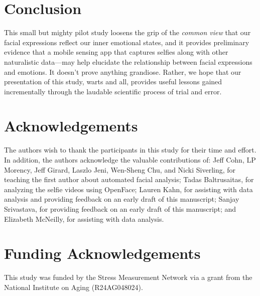 \documentclass[authordate, empirical]{jote-new-article}
\begin{document}
\section{Conclusion}







This small but mighty pilot study loosens the grip of the \emph{common view} that our facial expressions reflect our inner emotional states, and it provides preliminary evidence that a mobile sensing app that captures selfies along with other naturalistic data—may help elucidate the relationship between facial expressions and emotions. It doesn't prove anything grandiose. Rather, we hope that our presentation of this study, warts and all, provides useful lessons gained incrementally through the laudable scientific process of trial and error.






\section{Acknowledgements}







The authors wish to thank the participants in this study for their time and effort. In addition, the authors acknowledge the valuable contributions of: Jeff Cohn, LP Morency, Jeff Girard, Laszlo Jeni, Wen-Sheng Chu, and Nicki Siverling, for teaching the first author about automated facial analysis; Tadas Baltrusaitas, for analyzing the selfie videos using OpenFace; Lauren Kahn, for assisting with data analysis and providing feedback on an early draft of this manuscript; Sanjay Srivastava, for providing feedback on an early draft of this manuscript; and Elizabeth McNeilly, for assisting with data analysis.










\section{Funding Acknowledgements}

This study was funded by the Stress Measurement Network via a grant from the National Institute on Aging (R24AG048024).
\end{document}
